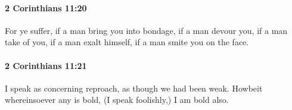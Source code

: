 		\paragraph{2 Corinthians 11:20} %
			\label{2CORINTHIANS-11-20}

			For ye suffer, if a man bring you into bondage, if a man devour you, if a man take of you, if a man exalt himself, if a man smite you on the face.

			\begin{framed}
			\scriptsize
				\begin{compactdesc}
					\item[SBLG] 
				\end{compactdesc}
			\end{framed}

		\paragraph{2 Corinthians 11:21} %
			\label{2CORINTHIANS-11-21}

			I speak as concerning reproach, as though we had been weak.  Howbeit whereinsoever any is bold, (I speak foolishly,) I am bold also.


